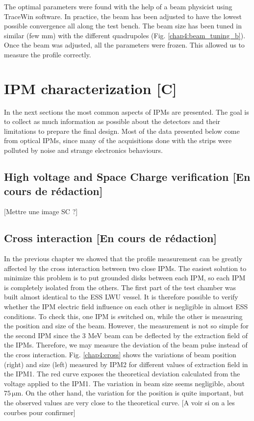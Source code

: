 \begin{refsection}
  The optimal parameters were found with the help of a beam physicist using TraceWin software. In practice, the beam has been adjusted to have the lowest possible convergence all along the test bench. The beam size has been tuned  in similar (few mm) with the different quadrupoles (Fig. \ref{chap4:beam_tuning_b}). Once the beam was adjusted, all the parameters were frozen. This allowed us to measure the profile correctly.

  


  \section{IPM characterization [C]}
  In the next sections the most common aspects of IPMs are presented. The goal is to collect as much information as possible about the detectors and their limitations to prepare the final design. Most of the data presented below come from optical IPMs, since many of the acquisitions done with the strips were polluted by noise and strange electronics behaviours.

  \subsection{High voltage and Space Charge verification [En cours de rédaction]}
  [Mettre une image SC ?]

  

  \subsection{Cross interaction [En cours de rédaction]}

  In the previous chapter we showed that the profile measurement can be greatly affected by the cross interaction between two close IPMs. The easiest solution to minimize this problem is to put grounded disks between each IPM, so each IPM is completely isolated from the others. The first part of the test chamber was built almost identical to the ESS LWU vessel. It is therefore possible to verify whether the IPM electric field influence on each other is negligible in almost ESS conditions. To check this, one IPM is switched on, while the other is measuring the position and size of the beam. However, the measurement is not so simple for the second IPM since the 3 MeV beam can be deflected by the extraction field of the IPMs. Therefore, we may measure the deviation of the beam pulse instead of the cross interaction. Fig. \ref{chap4:cross} shows the variations of beam position (right) and size (left) measured by IPM2 for different values of extraction field in the IPM1. The red curve exposes the theoretical deviation calculated from the voltage applied to the IPM1. The variation in beam size seems negligible, about $75\,\mathrm{\mu m}$. On the other hand, the variation for the position is quite important, but the observed values are very close to the theoretical curve.
  [A voir si on a les courbes pour confirmer]


\end{refsection}
